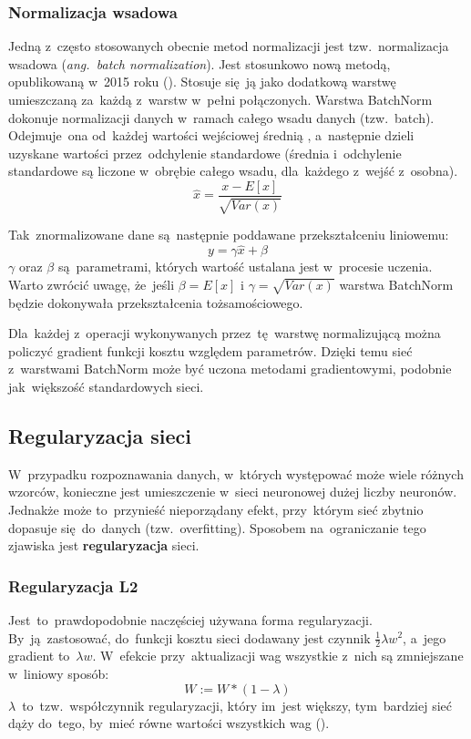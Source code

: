 \subsubsection{Normalizacja wsadowa}
Jedną z~często stosowanych obecnie metod normalizacji jest tzw.~normalizacja wsadowa (\textit{ang.~batch normalization}).
Jest stosunkowo nową metodą, opublikowaną w~2015 roku (\cite{batch-norm}). Stosuje się~ją jako
dodatkową warstwę umieszczaną za~każdą z~warstw w~pełni połączonych. Warstwa BatchNorm dokonuje normalizacji danych
w~ramach całego wsadu danych (tzw.~batch). Odejmuje~ona od~każdej wartości wejściowej średnią , a~następnie dzieli
uzyskane wartości przez~odchylenie standardowe (średnia i~odchylenie standardowe są liczone w~obrębie całego wsadu,
dla~każdego z~wejść z~osobna).
\begin{equation*}
 \widehat{x} = \frac{x - E[x]}{\sqrt{Var(x)}}
\end{equation*}

Tak~znormalizowane dane są~następnie poddawane przekształceniu liniowemu:
\begin{equation*}
y = \gamma\widehat{x} + \beta
\end{equation*}
$\gamma$ oraz $\beta$ są~parametrami, których wartość ustalana jest w~procesie uczenia. Warto zwrócić uwagę, że~jeśli
$\beta=E[x]$ i $\gamma=\sqrt{Var(x)}$ warstwa BatchNorm będzie dokonywała przekształcenia tożsamościowego.

Dla~każdej z~operacji wykonywanych przez~tę~warstwę normalizującą można policzyć gradient funkcji kosztu względem
parametrów. Dzięki temu sieć z~warstwami BatchNorm może być uczona metodami gradientowymi, podobnie jak~większość
standardowych sieci.

\subsection{Regularyzacja sieci}
W~przypadku rozpoznawania danych, w~których występować może wiele różnych wzorców, konieczne jest umieszczenie w~sieci
neuronowej dużej liczby neuronów. Jednakże może to~przynieść nieporządany efekt, przy~którym sieć zbytnio dopasuje
się~do~danych (tzw.~overfitting). Sposobem na~ograniczanie tego zjawiska jest \textbf{regularyzacja} sieci.

\subsubsection{Regularyzacja L2} \label{sssec:reg_L2}
Jest~to~prawdopodobnie naczęściej używana forma regularyzacji. By~ją~zastosować, do~funkcji kosztu sieci dodawany
jest czynnik $\frac{1}{2}\lambda w^2$, a~jego gradient to~$\lambda w$. W~efekcie przy~aktualizacji wag wszystkie
z~nich są zmniejszane w~liniowy sposób:
\begin{equation*}
W := W*(1 -\lambda)
\end{equation*}
$\lambda$~to~tzw.~współczynnik regularyzacji, który im~jest większy, tym~bardziej sieć dąży do~tego,
by~mieć równe wartości wszystkich wag (\cite{L2-regularization}).

